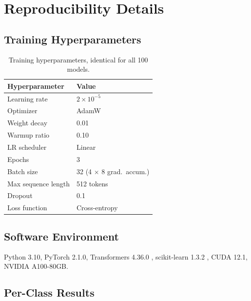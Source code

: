 \documentclass[11pt]{article}
\begin{document}
\appendix

\section{Reproducibility Details}
\label{sec:appendix}

\subsection{Training Hyperparameters}
\label{sec:hyperparams}

\begin{table}[H]
\centering
\small
\begin{tabular}{@{}ll@{}}
\toprule
\textbf{Hyperparameter} & \textbf{Value} \\
\midrule
Learning rate & $2 \times 10^{-5}$ \\
Optimizer & AdamW \\
Weight decay & 0.01 \\
Warmup ratio & 0.10 \\
LR scheduler & Linear \\
Epochs & 3 \\
Batch size & 32 (4 $\times$ 8 grad.\ accum.) \\
Max sequence length & 512 tokens \\
Dropout & 0.1 \\
Loss function & Cross-entropy \\
\bottomrule
\end{tabular}
\caption{Training hyperparameters, identical for all 100 models.}
\label{tab:hyperparams}
\end{table}

\subsection{Software Environment}
\label{sec:environment}

Python 3.10, PyTorch 2.1.0, Transformers 4.36.0 \citep{wolf2020transformers}, scikit-learn 1.3.2 \citep{pedregosa2011scikitlearn}, CUDA 12.1, NVIDIA A100-80GB.

\subsection{Per-Class Results}
\label{sec:per_class}
\end{document}
